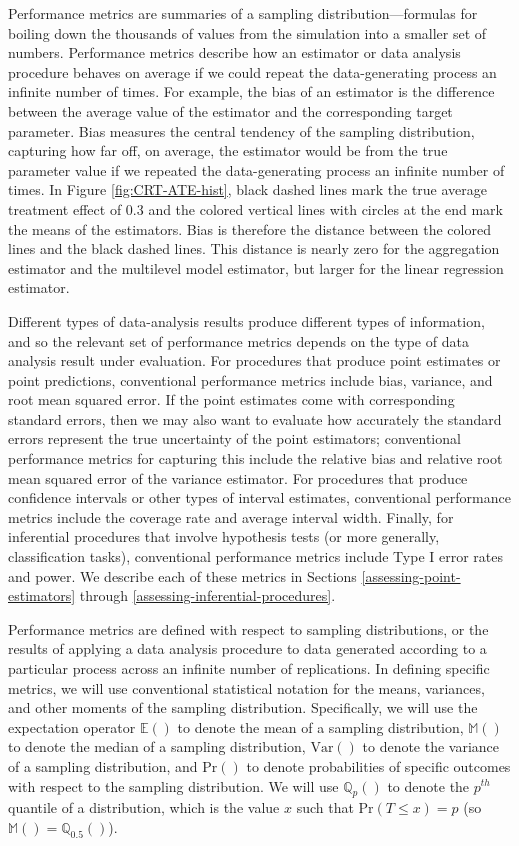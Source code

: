 \documentclass[
]{book}
\newcommand{\Prob}{\text{Pr}}
\newcommand{\E}{\mathbb{E}}
\newcommand{\M}{\mathbb{M}}
\newcommand{\Q}{\mathbb{Q}}
\newcommand{\Var}{\text{Var}}
\begin{document}
Performance metrics are summaries of a sampling distribution---formulas for boiling down the thousands of values from the simulation into a smaller set of numbers. Performance metrics describe how an estimator or data analysis procedure behaves on average if we could repeat the data-generating process an infinite number of times.
For example, the bias of an estimator is the difference between the average value of the estimator and the corresponding target parameter. Bias measures the central tendency of the sampling distribution, capturing how far off, on average, the estimator would be from the true parameter value if we repeated the data-generating process an infinite number of times.
In Figure \ref{fig:CRT-ATE-hist}, black dashed lines mark the true average treatment effect of 0.3 and the colored vertical lines with circles at the end mark the means of the estimators.
Bias is therefore the distance between the colored lines and the black dashed lines.
This distance is nearly zero for the aggregation estimator and the multilevel model estimator, but larger for the linear regression estimator.

Different types of data-analysis results produce different types of information, and so the relevant set of performance metrics depends on the type of data analysis result under evaluation.
For procedures that produce point estimates or point predictions, conventional performance metrics include bias, variance, and root mean squared error.
If the point estimates come with corresponding standard errors, then we may also want to evaluate how accurately the standard errors represent the true uncertainty of the point estimators; conventional performance metrics for capturing this include the relative bias and relative root mean squared error of the variance estimator.
For procedures that produce confidence intervals or other types of interval estimates, conventional performance metrics include the coverage rate and average interval width.
Finally, for inferential procedures that involve hypothesis tests (or more generally, classification tasks), conventional performance metrics include Type I error rates and power.
We describe each of these metrics in Sections \ref{assessing-point-estimators} through \ref{assessing-inferential-procedures}.

Performance metrics are defined with respect to sampling distributions, or the results of applying a data analysis procedure to data generated according to a particular process across an infinite number of replications.
In defining specific metrics, we will use conventional statistical notation for the means, variances, and other moments of the sampling distribution.
Specifically, we will use the expectation operator \(\E()\) to denote the mean of a sampling distribution, \(\M()\) to denote the median of a sampling distribution, \(\Var()\) to denote the variance of a sampling distribution, and \(\Prob()\) to denote probabilities of specific outcomes with respect to the sampling distribution.
We will use \(\Q_p()\) to denote the \(p^{th}\) quantile of a distribution, which is the value \(x\) such that \(\Prob(T \leq x) = p\) (so \(\M() = \Q_{0.5}()\)).
\end{document}
